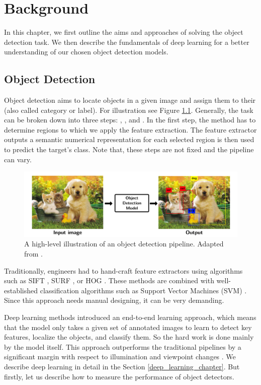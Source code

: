 \chapter{Background}
In this chapter, we first outline the aims and approaches of solving the object
detection task. We then describe the fundamentals of deep learning for a better
understanding of our chosen object detection models.

\section{Object Detection}
Object detection aims to locate objects in a given image and assign them to
their  (also called category or label). For illustration see Figure
\ref{fig:od}. Generally, the task can be broken down into three steps:
, , and
. In the first step, the method has to determine regions to
which we apply the feature extraction. The feature extractor outputs a semantic
numerical representation for each selected region is then used to predict the
target's class. Note that, these steps are not fixed and the pipeline can vary.

\begin{figure}[h]
    \centering
    \includegraphics[width=0.9\linewidth]{Sources/Figures/objectdetection.png}
    \caption{A high-level illustration of an object detection pipeline. Adapted
        from \cite{objectdetectionfigure}.}
    \label{fig:od}
\end{figure}

Traditionally, engineers had to hand-craft feature extractors using algorithms
such as SIFT \cite{sift}, SURF \cite{surf}, or HOG \cite{hog}. These methods are
combined with well-established classification algorithms such as Support Vector
Machines (SVM) \cite{svm}. Since this approach needs manual designing, it can be
very demanding.

Deep learning methods introduced an end-to-end learning approach, which means
that the model only takes a given set of annotated images to learn to detect key
features, localize the objects, and classify them. So the hard work is done
mainly by the model itself. This approach outperforms the traditional pipelines
by a significant margin with respect to illumination and viewpoint changes
\cite{outperforming}. We describe deep learning in detail in the Section
\ref{deep_learning_chapter}. But firstly, let us describe how to measure the
performance of object detectors.


